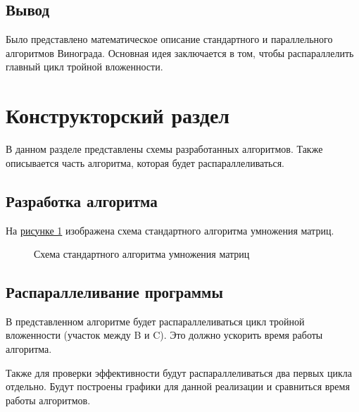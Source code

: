 \documentclass[14pt, a4paper]{extarticle}
\begin{document}
\subsection{Вывод}
Было представлено математическое описание стандартного и параллельного алгоритмов Винограда. Основная идея заключается в том, чтобы распараллелить главный цикл тройной вложенности.

\clearpage
\section{Конструкторский раздел}
В данном разделе представлены схемы разработанных алгоритмов. Также описывается часть алгоритма, которая будет распараллеливаться.
\subsection{Разработка алгоритма}
На \hyperref[Algorithm1]{рисунке 1} изображена схема стандартного алгоритма умножения матриц.
\begin{figure}[h!]\label{Algorithm1}
	\caption{Схема стандартного алгоритма умножения матриц}
\end{figure}
\subsection{Распараллеливание программы}
В представленном алгоритме будет распараллеливаться цикл тройной вложенности (участок между B и C). Это должно ускорить время работы алгоритма.\par
Также для проверки эффективности будут распараллеливаться два первых цикла отдельно. Будут построены графики для данной реализации и сравниться время работы алгоритмов.
\end{document}
